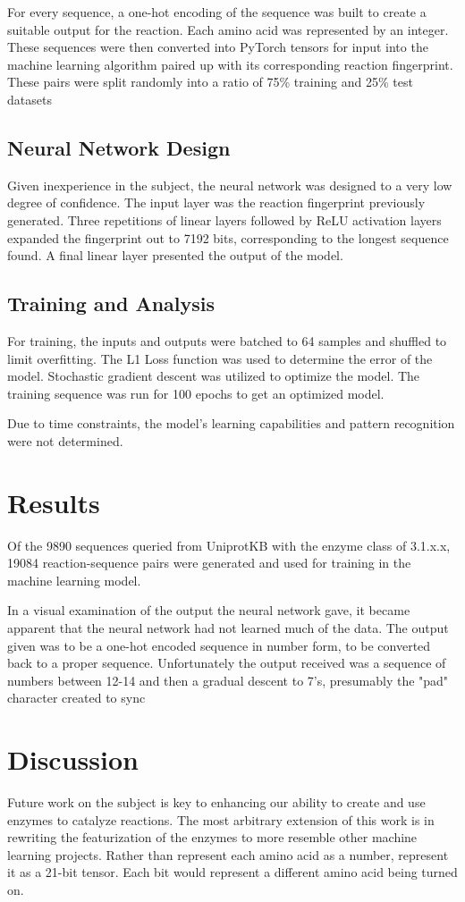 \documentclass[12pt]{article}
\begin{document}
For every sequence, a one-hot encoding of the sequence was built to create a suitable
output for the reaction. Each amino acid was represented by an integer.
These sequences were then converted into PyTorch tensors
for input into the machine learning algorithm paired up with its corresponding reaction fingerprint.
These pairs were split randomly into a ratio of 75\% training and 25\% test datasets

\subsection{Neural Network Design}
Given inexperience in the subject, the neural network was designed to a very low
degree of confidence. The input layer was the reaction fingerprint previously generated.
Three repetitions of linear layers followed by ReLU activation layers expanded the
fingerprint out to 7192 bits, corresponding to the longest sequence found. A final
linear layer presented the output of the model.

\subsection{Training and Analysis}
For training, the inputs and outputs were batched to 64 samples and shuffled to
limit overfitting. The L1 Loss function was used to determine the error of the
model. Stochastic gradient descent was utilized to optimize the model.
The training sequence was run for 100 epochs to get an optimized model.

Due to time constraints, the model's learning capabilities and pattern recognition
were not determined.

\section{Results}
Of the 9890 sequences queried from UniprotKB with the enzyme class of 3.1.x.x, 19084
reaction-sequence pairs were generated and used for training in the machine learning
model. 

In a visual examination of the output the neural network gave, it became apparent that
the neural network had not learned much of the data. The output given was to be a
one-hot encoded sequence in number form, to be converted back to a proper sequence. Unfortunately
the output received was a sequence of numbers between 12-14 and then a gradual descent
to 7's, presumably the "pad" character created to sync 

\section{Discussion}
Future work on the subject is key to enhancing our ability to create and use enzymes
to catalyze reactions. The most arbitrary extension of this work is in rewriting
the featurization of the enzymes to more resemble other machine learning projects.
Rather than represent each amino acid as a number, represent it as a 21-bit tensor.
Each bit would represent a different amino acid being turned on. 
\end{document}
